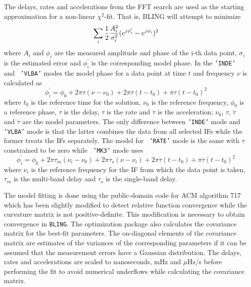 The delays, rates and accelerations from the FFT search are used as
the starting approximation for a non-linear $\chi^2$-fit.  That is,
BLING will attempt to minimize
\begin{equation}
\sum_i {1 \over 2} {{A_i^2} \over {\sigma_i^2}}
	(e^{j\phi_i^\prime} - e^{j\phi_i})^2
\end{equation}
where $A_i$ and $\phi_i$ are the measured amplitude and phase of the
i-th data point, $\sigma_i$ is the estimated error and $\phi_i^\prime$
is the corresponding model phase.  In the {\tt 'INDE'} and {\tt
'VLBA'} modes the model phase for a data point at time $t$ and
frequency $\nu$ is calculated as
\begin{equation}
\phi_i^\prime = \phi_0 + 2 \pi \tau (\nu - \nu_0)
	+ 2 \pi \dot{\tau} (t - t_0) + \pi \ddot{\tau} (t - t_0)^2
\end{equation}
where $t_0$ is the reference time for the solution, $\nu_0$ is the
reference frequency, $\phi_0$ is a reference phase, $\tau$ is the
delay, $\dot{\tau}$ is the rate and $\ddot{\tau}$ is the acceleration;
$\nu_0$, $\tau$, $\dot{\tau}$ and $\ddot{\tau}$ are the model
parameters.  The only difference between {\tt 'INDE'} mode and {\tt
'VLBA'} mode is that the latter combines the data from all selected
IFs while the former treats the IFs separately.  The model for {\tt
'RATE'} mode is the same with $\tau$ constrained to be zero while {\tt
'MK3'} mode uses
\begin{equation}
\phi_i^\prime = \phi_0 + 2 \pi \tau_m (\nu_i - \nu_0)
	+ 2 \pi \tau_s (\nu - \nu_i)
	+ 2 \pi \dot{\tau} (t - t_0) + \pi \ddot{\tau} (t - t_0)^2
\end{equation}
where $\nu_i$ is the reference frequency for the IF from which the
data point is taken, $\tau_m$ is the multi-band delay and $\tau_s$ is
the single-band delay.

The model fitting is done using the public-domain code for ACM
algorithm 717 \cite{bgw:717} which has been slightly modified to
detect relative function convergence while the curvature matrix is not
positive-definite.  This modification is necessary to obtain
convergence in {\tt BLING}.  The optimization package also calculates
the covariance matrix for the best-fit parameters.  The on-diagonal
elements of the covariance matrix are estimates of the variances of
the corresponding parameters if it can be assumed that the measurement
errors have a Gaussian distribution.  The delays, rates and
accelerations are scaled to nanoseconds, mHz and $\mu$Hz/s before
performing the fit to avoid numerical underflows while calculating the
covariance matrix.

